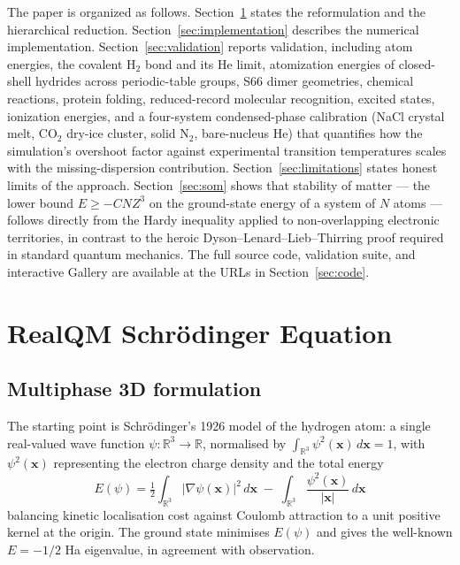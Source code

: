 \documentclass[11pt]{article}
\begin{document}
The paper is organized as follows. Section~\ref{sec:reformulation} states the reformulation and the hierarchical reduction. Section~\ref{sec:implementation} describes the numerical implementation. Section~\ref{sec:validation} reports validation, including atom energies, the covalent H$_2$ bond and its He limit, atomization energies of closed-shell hydrides across periodic-table groups, S66 dimer geometries, chemical reactions, protein folding, reduced-record molecular recognition, excited states, ionization energies, and a four-system condensed-phase calibration (NaCl crystal melt, CO$_2$ dry-ice cluster, solid N$_2$, bare-nucleus He) that quantifies how the simulation's overshoot factor against experimental transition temperatures scales with the missing-dispersion contribution. Section~\ref{sec:limitations} states honest limits of the approach. Section~\ref{sec:som} shows that stability of matter --- the lower bound $E \ge -C N Z^3$ on the ground-state energy of a system of $N$ atoms --- follows directly from the Hardy inequality applied to non-overlapping electronic territories, in contrast to the heroic Dyson--Lenard--Lieb--Thirring proof required in standard quantum mechanics. The full source code, validation suite, and interactive Gallery are available at the URLs in Section~\ref{sec:code}.

\section{RealQM Schr\"odinger Equation}\label{sec:reformulation}

\subsection{Multiphase 3D formulation}

The starting point is Schr\"odinger's 1926 model of the hydrogen atom: a single real-valued wave function $\psi : \mathbb{R}^3 \to \mathbb{R}$, normalised by $\int_{\mathbb{R}^3} \psi^2(\mathbf{x})\,d\mathbf{x} = 1$, with $\psi^2(\mathbf{x})$ representing the electron charge density and the total energy
\begin{equation}\label{eq:H-energy}
E(\psi) = \tfrac{1}{2} \int_{\mathbb{R}^3} |\nabla \psi(\mathbf{x})|^2 \, d\mathbf{x}
\;-\; \int_{\mathbb{R}^3} \frac{\psi^2(\mathbf{x})}{|\mathbf{x}|}\, d\mathbf{x}
\end{equation}
balancing kinetic localisation cost against Coulomb attraction to a unit positive kernel at the origin. The ground state minimises $E(\psi)$ and gives the well-known $E = -1/2$ Ha eigenvalue, in agreement with observation.
\end{document}
